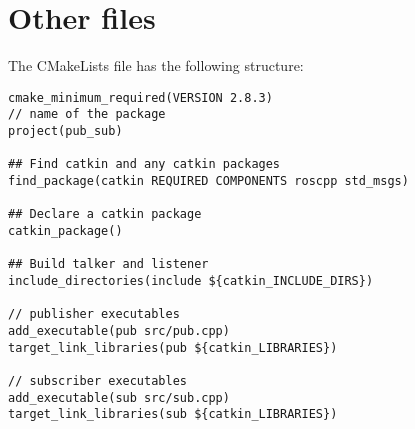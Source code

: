 \section{Other files}

The CMakeLists file has the following structure: 
\begin{verbatim}
cmake_minimum_required(VERSION 2.8.3)
// name of the package
project(pub_sub)

## Find catkin and any catkin packages
find_package(catkin REQUIRED COMPONENTS roscpp std_msgs)

## Declare a catkin package
catkin_package()

## Build talker and listener
include_directories(include ${catkin_INCLUDE_DIRS})

// publisher executables
add_executable(pub src/pub.cpp)
target_link_libraries(pub ${catkin_LIBRARIES})

// subscriber executables
add_executable(sub src/sub.cpp)
target_link_libraries(sub ${catkin_LIBRARIES})
\end{verbatim}

